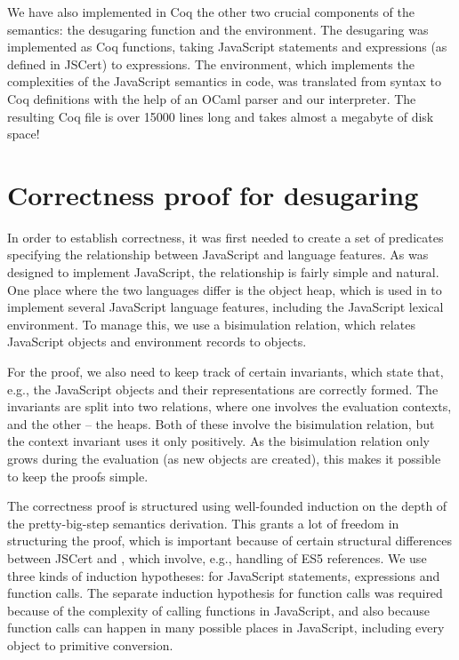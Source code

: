\documentclass{llncs}
\begin{document}
We have also implemented in Coq the other two crucial components
of the \lambdajs{} semantics: the desugaring function and the 
environment. The desugaring was implemented as Coq functions,
taking JavaScript statements and expressions (as defined in
JSCert) to \lambdajs{} expressions. The environment, which
implements the complexities of the JavaScript semantics
in \lambdajs{} code, was translated from \lambdajs{} syntax
to Coq definitions with the help of an OCaml parser and
our interpreter. The resulting Coq file is over 15000 lines long
and takes almost a megabyte of disk space!

\section{Correctness proof for \lambdajs{} desugaring}

In order to establish correctness, it was first needed to create
a set of predicates specifying the relationship between 
JavaScript and \lambdajs{} language features. As \lambdajs{} was
designed to implement JavaScript, the relationship is fairly
simple and natural. One place where the two languages differ
is the object heap, which is used in \lambdajs{} to implement
several JavaScript language features, including the
JavaScript lexical environment. To manage this, we use a bisimulation
relation, which relates JavaScript objects and environment records
to \lambdajs{} objects.

For the proof, we also need to keep track of certain invariants,
which state that, e.g., the JavaScript objects and their
\lambdajs{} representations are correctly formed. 
The invariants are split into two relations, where one
involves the evaluation contexts, and the other -- the heaps.
Both of these involve the bisimulation relation, but the
context invariant uses it only positively. As the bisimulation
relation only grows during the evaluation (as new objects
are created), this makes it possible to keep the proofs simple.

The correctness proof is structured using well-founded 
induction on the depth of the \lambdajs{} pretty-big-step
semantics derivation. This grants a lot of freedom in structuring
the proof, which is important because of certain structural
differences between JSCert and \lambdajs{}, which involve,
e.g., handling of ES5 references. We use three kinds of induction
hypotheses: for JavaScript statements, expressions and
function calls. The separate induction hypothesis for function
calls was required because of the complexity of calling functions
in JavaScript, and also because function calls can happen in
many possible places in JavaScript, including every
object to primitive conversion.
\end{document}
